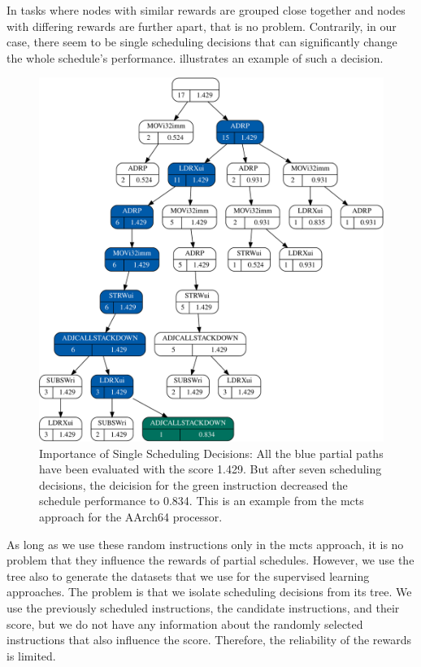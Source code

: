 In tasks where nodes with similar rewards are grouped close together and nodes with differing rewards are further apart, that is no problem.
Contrarily, in our case, there seem to be single scheduling decisions that can significantly change the whole schedule's performance.
 illustrates an example of such a decision.
\begin{figure}
    \includegraphics[width=\textwidth]{img/mcts-scores/2-crop.pdf}
    \caption[Importance of Single Scheduling Decisions]{Importance of Single Scheduling Decisions: All the blue partial paths have been evaluated with the score 1.429. 
    But after seven scheduling decisions, the deicision for the green instruction decreased the schedule performance to 0.834.
    This is an example from the \ac{mcts} approach for the AArch64 processor.}
    \label{fig:eval:changing-performance}
\end{figure}

As long as we use these random instructions only in the \ac{mcts} approach, it is no problem that they influence the rewards of partial schedules.
However, we use the tree also to generate the datasets that we use for the supervised learning approaches.
The problem is that we isolate scheduling decisions from its tree.
We use the previously scheduled instructions, the candidate instructions, and their score, but we do not have any information about the randomly selected instructions that also influence the score.
Therefore, the reliability of the rewards is limited.

